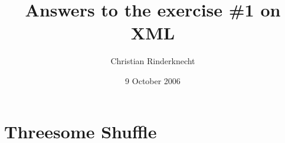 \documentclass[11pt,a4paper]{article}
\title{Answers to the exercise \#1 on XML}
\author{Christian Rinderknecht}
\date{9 October 2006}
\begin{document}
\maketitle
\thispagestyle{empty}

\section{Threesome Shuffle}






\end{document}
